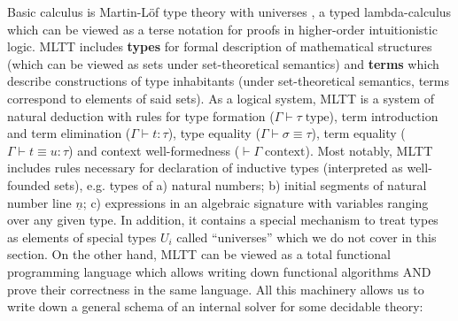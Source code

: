 \documentclass[manuscript,screen,review]{acmart}
\begin{document}
Basic calculus is Martin-L\"of type theory with universes \cite{mltt}, a typed
lambda-calculus which can be viewed as a terse notation for proofs in
higher-order intuitionistic logic. MLTT includes \textbf{types} for formal
description of mathematical structures (which can be viewed as sets under
set-theoretical semantics) and \textbf{terms} which describe constructions of
type inhabitants (under set-theoretical semantics, terms correspond to elements
of said sets). As a logical system, MLTT is a system of natural deduction with
rules for type formation ($\Gamma \vdash \tau \; \mathrm{type}$), term
introduction and term elimination ($\Gamma \vdash t : \tau$), type equality
($\Gamma \vdash \sigma \equiv \tau$), term equality
($\Gamma \vdash t \equiv u : \tau$) and context well-formedness
($\vdash \Gamma \; \mathrm{context}$). Most notably, MLTT includes rules
necessary for declaration of inductive types (interpreted as well-founded sets),
e.g. types of a) natural numbers; b) initial segments of natural number line
$\underline{n}$; c) expressions in an algebraic signature with variables ranging
over any given type. In addition, it contains a special mechanism to treat types
as elements of special types $U_i$ called ``universes'' which we do not cover
in this section. On the other hand, MLTT can be viewed as a total functional
programming language which allows writing down functional algorithms AND prove
their correctness in the same language. All this machinery allows us to write
down a general schema of an internal solver for some decidable theory:
\end{document}

